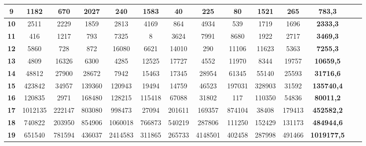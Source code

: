 \documentclass[10pt,a4paper,spanish]{report}
\begin{document}
\begin{table}[h!]
\begin{adjustbox}{max width=\textwidth}
\begin{tabular}{*{14}{|c}|}
   \textbf{9}                      & 1182       & 670        & 2027       & 240        & 1583       & 40         & 225        & 80         & 1521       & 265         & \textbf{783,3}      \\ \hline
   \textbf{10}                     & 2511       & 2229       & 1859       & 2813       & 4169       & 864        & 4934       & 539        & 1719       & 1696        & \textbf{2333,3}     \\ \hline
   \textbf{11}                     & 416        & 1217       & 793        & 7325       & 8          & 3624       & 7991       & 8680       & 1922       & 2717        & \textbf{3469,3}     \\ \hline
   \textbf{12}                     & 5860       & 728        & 872        & 16080      & 6621       & 14010      & 290        & 11106      & 11623      & 5363        & \textbf{7255,3}     \\ \hline
   \textbf{13}                     & 4809       & 16326      & 6300       & 4285       & 12525      & 17727      & 4552       & 11970      & 8344       & 19757       & \textbf{10659,5}    \\ \hline
   \textbf{14}                     & 48812      & 27900      & 28672      & 7942       & 15463      & 17345      & 28954      & 61345      & 55140      & 25593       & \textbf{31716,6}    \\ \hline
   \textbf{15}                     & 423842     & 34957      & 139360     & 120943     & 19494      & 14759      & 46523      & 197031     & 328903     & 31592       & \textbf{135740,4}   \\ \hline
   \textbf{16}                     & 120835     & 2971       & 168480     & 128215     & 115418     & 67088      & 31802      & 117        & 110350     & 54836       & \textbf{80011,2}    \\ \hline
   \textbf{17}                     & 1012135    & 222147     & 803080     & 998473     & 27094      & 201611     & 169357     & 874104     & 38408      & 179413      & \textbf{452582,2}   \\ \hline
   \textbf{18}                     & 740822     & 203950     & 854906     & 1060018    & 766873     & 540219     & 287806     & 111250     & 152429     & 131173      & \textbf{484944,6}   \\ \hline
   \textbf{19}                     & 651540     & 781594     & 436037     & 2414583    & 311865     & 265733     & 4148501    & 402458     & 287998     & 491466      & \textbf{1019177,5}  \\ \hline

\end{tabular}
\end{adjustbox}
\end{table}
\end{document}
